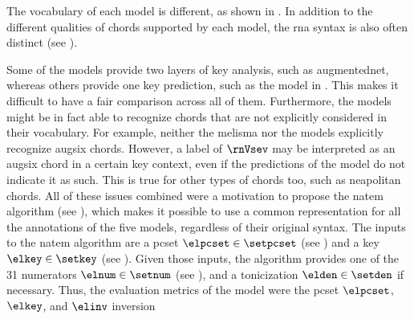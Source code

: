 
The vocabulary of each model is different, as shown in
. In addition to the different
qualities of chords supported by each model, the \gls{rna}
syntax is also often distinct (see
). 


Some of the models provide two layers of key analysis, such
as \gls{augmentednet}, whereas others provide one key
prediction, such as the model in
\textcite{mcleod2021modular}. This makes it difficult to
have a fair comparison across all of them. Furthermore, the
models might be in fact able to recognize chords that are
not explicitly considered in their vocabulary. For example,
neither the \gls{melisma} nor the
\textcite{mcleod2021modular} models explicitly recognize
\gls{augsix} chords. However, a label of $\rnVsev$ may be
interpreted as an \gls{augsix} chord in a certain key
context, even if the predictions of the model do not
indicate it as such. This is true for other types of chords
too, such as \gls{neapolitan} chords. All of these issues
combined were a motivation to propose the \gls{natem}
algorithm (see
), which
makes it possible to use a common representation for all the
annotations of the five models, regardless of their original
syntax. The inputs to the \gls{natem} algorithm are a
\gls{pcset} $\elpcset \in \setpcset$ (see
) and a key $\elkey
\in \setkey$ (see ).
Given those inputs, the algorithm provides one of the 31
numerators $\elnum \in \setnum$ (see
), and a
tonicization $\elden \in \setden$ if necessary. Thus, the
evaluation metrics of the model were the \gls{pcset}
$\elpcset$, $\elkey$, and $\elinv$ inversion

